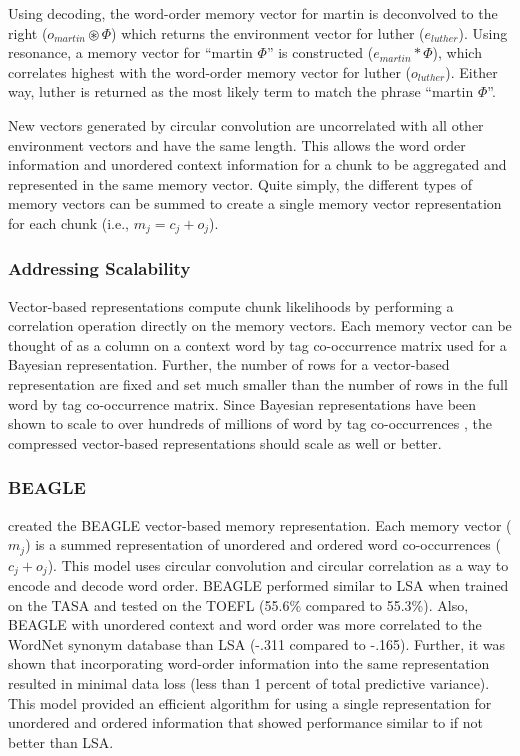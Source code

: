 \documentclass[man,floatsintext,donotrepeattitle]{apa6}
\begin{document}
Using decoding, the word-order memory vector for martin is deconvolved to the right ($o_{martin} \circledast \Phi$) which returns the environment vector for luther ($e_{luther}$).
Using resonance, a memory vector for ``martin $\Phi$'' is constructed ($e_{martin} * \Phi$), which correlates highest with the word-order memory vector for luther ($o_{luther}$).
Either way, luther is returned as the most likely term to match the phrase ``martin $\Phi$''.

New vectors generated by circular convolution are uncorrelated with all other environment vectors and have the same length.
This allows the word order information and unordered context information for a chunk to be aggregated and represented in the same memory vector.
Quite simply, the different types of memory vectors can be summed to create a single memory vector representation for each chunk (i.e., $m_{j} = c_{j} + o_{j}$).

\subsubsection{Addressing Scalability}

Vector-based representations compute chunk likelihoods by performing a correlation operation directly on the memory vectors.
Each memory vector can be thought of as a column on a context word by tag co-occurrence matrix used for a Bayesian representation.
Further, the number of rows for a vector-based representation are fixed and set much smaller than the number of rows in the full word by tag co-occurrence matrix.
Since Bayesian representations have been shown to scale to over hundreds of millions of word by tag co-occurrences \parencite{Stanley2013}, the compressed vector-based representations should scale as well or better.

\subsubsection{BEAGLE}

\textcite{Jones2007} created the BEAGLE vector-based memory representation.
Each memory vector ($m_{j}$) is a summed representation of unordered and ordered word co-occurrences ($c_{j} + o_{j}$).
This model uses circular convolution and circular correlation as a way to encode and decode word order.
BEAGLE performed similar to LSA when trained on the TASA and tested on the TOEFL (55.6\% compared to 55.3\%).
Also, BEAGLE with unordered context and word order was more correlated to the WordNet synonym database than LSA (-.311 compared to -.165).
Further, it was shown that incorporating word-order information into the same representation resulted in minimal data loss (less than 1 percent of total predictive variance).
This model provided an efficient algorithm for using a single representation for unordered and ordered information that showed performance similar to if not better than LSA.
\end{document}
